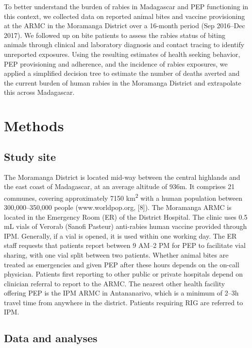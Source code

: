 \documentclass[
  oneside]{book}
\begin{document}
To better understand the burden of rabies in Madagascar and PEP functioning in this context, we collected data on reported animal bites and vaccine provisioning at the ARMC in the Moramanga District over a 16-month period (Sep 2016--Dec 2017). We followed up on bite patients to assess the rabies status of biting animals through clinical and laboratory diagnosis and contact tracing to identify unreported exposures. Using the resulting estimates of health seeking behavior, PEP provisioning and adherence, and the incidence of rabies exposures, we applied a simplified decision tree to estimate the number of deaths averted and the current burden of human rabies in the Moramanga District and extrapolate this across Madagascar.

\hypertarget{methods}{%
\section{Methods}\label{methods}}

\hypertarget{study-site}{%
\subsection{Study site}\label{study-site}}

The Moramanga District is located mid-way between the central highlands and the east coast of Madagascar, at an average altitude of 936m. It comprises 21 communes, covering approximately 7150 km\textsuperscript{2} with a human population between 300,000--350,000 people (www.worldpop.org, {[}8{]}). The Moramanga ARMC is located in the Emergency Room (ER) of the District Hospital. The clinic uses 0.5 mL vials of Verorab (Sanofi Pasteur) anti-rabies human vaccine provided through IPM. Generally, if a vial is opened, it is used within one working day. The ER staff requests that patients report between 9 AM--2 PM for PEP to facilitate vial sharing, with one vial split between two patients. Whether animal bites are treated as emergencies and given PEP after these hours depends on the on-call physician. Patients first reporting to other public or private hospitals depend on clinician referral to report to the ARMC. The nearest other health facility offering PEP is the IPM ARMC in Antananarivo, which is a minimum of 2--3h travel time from anywhere in the district. Patients requiring RIG are referred to IPM.

\hypertarget{data-and-analyses}{%
\subsection{Data and analyses}\label{data-and-analyses}}
\end{document}
